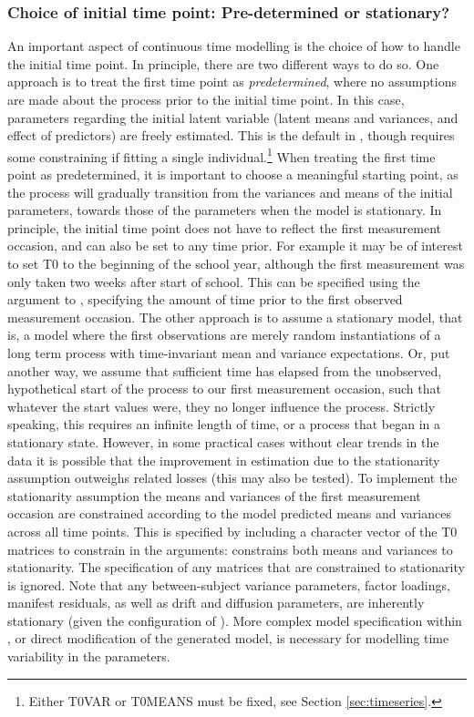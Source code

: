 \documentclass[nojss]{jss}\usepackage[]{graphicx}\usepackage[]{color}
\begin{document}
\subsubsection{Choice of initial time point: Pre-determined or stationary?}\nopagebreak
An important aspect of continuous time modelling is the choice of how to handle the initial time point. In principle, there are two different ways to do so. One approach is to treat the first time point as \textit{predetermined}, where no assumptions are made about the process prior to the initial time point. In this case, parameters regarding the initial latent variable (latent means and variances, and effect of predictors) are freely estimated. This is the default in , though requires some constraining if fitting a single individual.\footnote{Either T0VAR or T0MEANS must be fixed, see Section \ref{sec:timeseries}.} When treating the first time point as predetermined, it is important to choose a meaningful starting point, as the process will gradually transition from the variances and means of the initial parameters, towards those of the parameters when the model is stationary. In principle, the initial time point does not have to reflect the first measurement occasion, and can also be set to any time prior. For example it may be of interest to set T0 to the beginning of the school year, although the first measurement was only taken two weeks after start of school. This can be specified using the  argument to , specifying the amount of time prior to the first observed measurement occasion.
The other approach is to assume a stationary model, that is, a model where the first observations are merely random instantiations of a long term process with time-invariant mean and variance expectations.  Or, put another way, we assume that sufficient time has elapsed from the unobserved, hypothetical start of the process to our first measurement occasion, such that whatever the start values were, they no longer influence the process. Strictly speaking, this requires an infinite length of time, or a process that began in a stationary state. However, in some practical cases without clear trends in the data it is possible that the improvement in estimation due to the stationarity assumption outweighs related losses (this may also be tested). To implement the stationarity assumption the means and variances of the first measurement occasion are constrained according to the model predicted means and variances across all time points. This is specified by including a character vector of the T0 matrices to constrain in the  arguments:  constrains both means and variances to stationarity. The  specification of any matrices that are constrained to stationarity is ignored. Note that any between-subject variance parameters, factor loadings, manifest residuals, as well as drift and diffusion parameters, are inherently stationary (given the configuration of ). More complex model specification within , or direct modification of the generated  model, is necessary for modelling time variability in the parameters.
\end{document}
